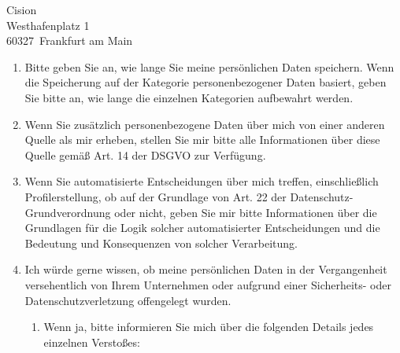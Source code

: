 \documentclass[a4paper, 12pt, KOMAold]{scrlttr2}
\newcommand{\Empfaenger}{Cision}            %
\newcommand{\EStrasse}{Westhafenplatz 1}    %
\newcommand{\EPLZ}{60327}                   %
\newcommand{\EOrt}{Frankfurt am Main}       %
\begin{document}
\begin{letter}{\Empfaenger \\ \EStrasse \\ \EPLZ~\EOrt}
\begin{enumerate}
        \item Bitte geben Sie an, wie lange Sie meine persönlichen Daten
        speichern. Wenn die Speicherung auf der Kategorie personenbezogener
        Daten basiert, geben Sie bitte an, wie lange die einzelnen Kategorien
        aufbewahrt werden.
        \item Wenn Sie zusätzlich personenbezogene Daten über mich von einer
        anderen Quelle als mir erheben, stellen Sie mir bitte alle
        Informationen über diese Quelle gemäß Art. 14 der DSGVO zur Verfügung.
        \item Wenn Sie automatisierte Entscheidungen über mich treffen,
        einschließlich Profilerstellung, ob auf der Grundlage von Art. 22 der
        Datenschutz-Grundverordnung oder nicht, geben Sie mir bitte
        Informationen über die Grundlagen für die Logik solcher automatisierter
        Entscheidungen und die Bedeutung und Konsequenzen von solcher
        Verarbeitung.
        \item Ich würde gerne wissen, ob meine persönlichen Daten in der Vergangenheit versehentlich von Ihrem Unternehmen oder aufgrund einer Sicherheits- oder Datenschutzverletzung offengelegt wurden.

       \begin{enumerate}
           \item Wenn ja, bitte informieren Sie mich über die folgenden Details jedes einzelnen Verstoßes:


\end{enumerate}
\end{enumerate}
\end{letter}
\end{document}
